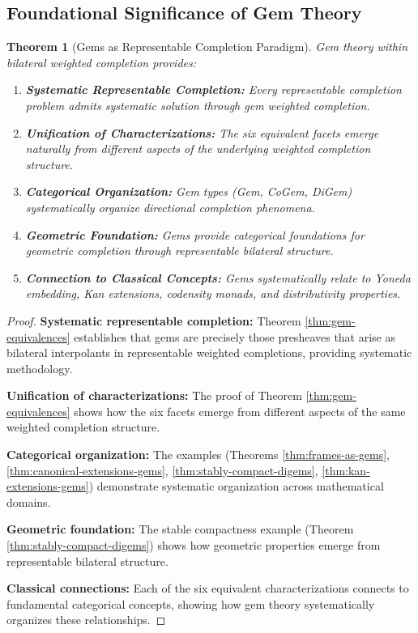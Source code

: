\documentclass[11pt]{article}
\theoremstyle{plain}
\newtheorem{theorem}{Theorem}[section]
\theoremstyle{definition}
\theoremstyle{remark}
\begin{document}
\subsection{Foundational Significance of Gem Theory}

\begin{theorem}[Gems as Representable Completion Paradigm]\label{thm:gem-paradigm}
Gem theory within bilateral weighted completion provides:

\begin{enumerate}
\item \textbf{Systematic Representable Completion:} Every representable completion problem admits systematic solution through gem weighted completion.

\item \textbf{Unification of Characterizations:} The six equivalent facets emerge naturally from different aspects of the underlying weighted completion structure.

\item \textbf{Categorical Organization:} Gem types (Gem, CoGem, DiGem) systematically organize directional completion phenomena.

\item \textbf{Geometric Foundation:} Gems provide categorical foundations for geometric completion through representable bilateral structure.

\item \textbf{Connection to Classical Concepts:} Gems systematically relate to Yoneda embedding, Kan extensions, codensity monads, and distributivity properties.
\end{enumerate}
\end{theorem}

\begin{proof}
\textbf{Systematic representable completion:} Theorem \ref{thm:gem-equivalences} establishes that gems are precisely those presheaves that arise as bilateral interpolants in representable weighted completions, providing systematic methodology.

\textbf{Unification of characterizations:} The proof of Theorem \ref{thm:gem-equivalences} shows how the six facets emerge from different aspects of the same weighted completion structure.

\textbf{Categorical organization:} The examples (Theorems \ref{thm:frames-as-gems}, \ref{thm:canonical-extensions-gems}, \ref{thm:stably-compact-digems}, \ref{thm:kan-extensions-gems}) demonstrate systematic organization across mathematical domains.

\textbf{Geometric foundation:} The stable compactness example (Theorem \ref{thm:stably-compact-digems}) shows how geometric properties emerge from representable bilateral structure.

\textbf{Classical connections:} Each of the six equivalent characterizations connects to fundamental categorical concepts, showing how gem theory systematically organizes these relationships.
\end{proof}
\end{document}

